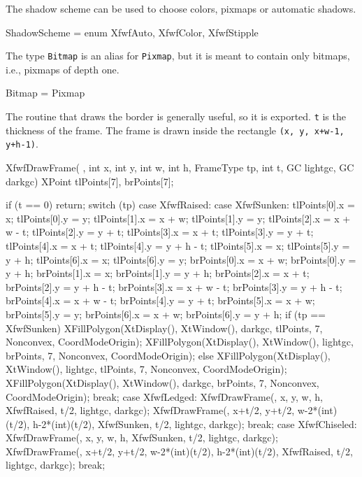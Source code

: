 \Section
The shadow scheme can be used to choose colors, pixmaps or automatic
shadows.

	

\Code
{\type} ShadowScheme = enum {\lbrace}XfwfAuto, XfwfColor, XfwfStipple{\rbrace}\endCode


\Section
The type {\tt Bitmap} is an alias for {\tt Pixmap}, but it is meant to
contain only bitmaps, i.e., pixmaps of depth one.

	

\Code
{\type} Bitmap = Pixmap \endCode


\Section
The routine that draws the border is generally useful, so it is
exported. {\tt t} is the thickness of the frame. The frame is drawn inside
the rectangle {\tt (x, y, x+w-1, y+h-1)}.



\Code
XfwfDrawFrame( {\dollar}, int  x, int  y, int  w, int  h, FrameType  tp, int  t, GC  lightgc, GC  darkgc)\endCode
{\lbrace}
    XPoint tlPoints[7], brPoints[7];

    if (t == 0) return;
    switch (tp) {\lbrace}
    case XfwfRaised:
    case XfwfSunken:
        tlPoints[0].x = x;              tlPoints[0].y = y;
        tlPoints[1].x = x + w;          tlPoints[1].y = y;
        tlPoints[2].x = x + w - t;      tlPoints[2].y = y + t;
        tlPoints[3].x = x + t;          tlPoints[3].y = y + t;
        tlPoints[4].x = x + t;          tlPoints[4].y = y + h - t;
        tlPoints[5].x = x;              tlPoints[5].y = y + h;
        tlPoints[6].x = x;              tlPoints[6].y = y;
        brPoints[0].x = x + w;          brPoints[0].y = y + h;
        brPoints[1].x = x;              brPoints[1].y = y + h;
        brPoints[2].x = x + t;          brPoints[2].y = y + h - t;
        brPoints[3].x = x + w - t;      brPoints[3].y = y + h - t;
        brPoints[4].x = x + w - t;      brPoints[4].y = y + t;
        brPoints[5].x = x + w;          brPoints[5].y = y;
        brPoints[6].x = x + w;          brPoints[6].y = y + h;
        if (tp == XfwfSunken) {\lbrace}
            XFillPolygon(XtDisplay({\dollar}), XtWindow({\dollar}),
                         darkgc, tlPoints, 7, Nonconvex, CoordModeOrigin);
            XFillPolygon(XtDisplay({\dollar}), XtWindow({\dollar}),
                         lightgc, brPoints, 7, Nonconvex, CoordModeOrigin);
        {\rbrace} else {\lbrace}
            XFillPolygon(XtDisplay({\dollar}), XtWindow({\dollar}),
                         lightgc, tlPoints, 7, Nonconvex, CoordModeOrigin);
            XFillPolygon(XtDisplay({\dollar}), XtWindow({\dollar}),
                         darkgc, brPoints, 7, Nonconvex, CoordModeOrigin);
        {\rbrace}
        break;
    case XfwfLedged:
        XfwfDrawFrame({\dollar}, x, y, w, h, XfwfRaised, t/2, lightgc, darkgc);
        XfwfDrawFrame({\dollar}, x+t/2, y+t/2, w-2*(int)(t/2), h-2*(int)(t/2),
                  XfwfSunken, t/2, lightgc, darkgc);
        break;
    case XfwfChiseled:
        XfwfDrawFrame({\dollar}, x, y, w, h, XfwfSunken, t/2, lightgc, darkgc);
        XfwfDrawFrame({\dollar}, x+t/2, y+t/2, w-2*(int)(t/2), h-2*(int)(t/2),
                  XfwfRaised, t/2, lightgc, darkgc);
        break;
    {\rbrace}

